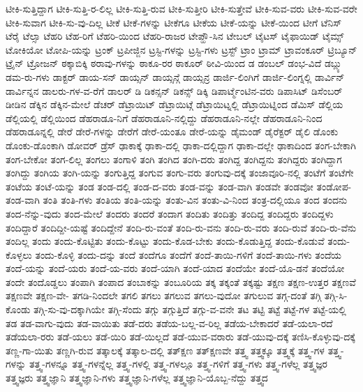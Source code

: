 {ಟೀಕಿ-ಸುತ್ತಿದ್ದಾಗ
ಟೀಕಿ-ಸುತ್ತಿ-ರ-ಲಿಲ್ಲ
ಟೀಕಿ-ಸುತ್ತಿ-ರುವ
ಟೀಕಿ-ಸುತ್ತೀರಿ
ಟೀಕಿ-ಸುತ್ತೇವೆ
ಟೀಕಿ-ಸುವ-ವರು
ಟೀಕಿ-ಸುವ-ವರೇ
ಟೀಕಿ-ಸುವಾಗ
ಟೀಕಿ-ಸು-ವು-ದಿಲ್ಲ
ಟೀಕೆ
ಟೀಕೆ-ಗಳನ್ನು
ಟೀಕೆಗೂ
ಟೀಕೆಯ
ಟೀಕೆ-ಯನ್ನು
ಟೀಕೆ-ಯಿಂದ
ಟೀಗೆ
ಟೆನಿಸ್
ಟೆರೈ
ಟೆಲ್ಸಾ
ಟೆಹರಿ
ಟೆಹ-ರಿಗೆ
ಟೆಹರಿ-ಯಿಂದ
ಟೆಹರಿ-ರಾಜರ
ಟೇಪ್ಹೌ-ಸಿನ
ಟೇಬಲ್
ಟೈಟಸ್
ಟೈಫಾಯಿಡ್
ಟೈಮ್ಸ್
ಟೋಕಿಯೋ
ಟೋಪಿ-ಯನ್ನು
ಟ್ರಂಕ್
ಟ್ರಪೀಜ್ಜಿನ
ಟ್ರಸ್ಟಿ-ಗಳನ್ನು
ಟ್ರಸ್ಟಿ-ಗಳು
ಟ್ರಸ್ಟ್
ಟ್ರಾಂ
ಟ್ರಾಮ್
ಟ್ರಾವಂಕೂರ್
ಟ್ರಿಬ್ಯೂನ್
ಟ್ರೈನ್
ಟ್ರೋಜನ್
ಠಕ್ಕಾಬಿಕ್ಕಿ
ಠರಾವು-ಗಳನ್ನು
ಠಾಕೂ-ರರ
ಠಾಕೂರ್
ಠೀವಿ-ಯಿಂದ
ಡ
ಡಂಬಲ್
ಡಂಭ-ವಿದೆ
ಡಬ್ಲ್ಯು
ಡಮ-ರು-ಗಳು
ಡಾಕ್ಟರ್
ಡಾಯ-ಸನ್
ಡಾಯ್ಸನ್
ಡಾಯ್ಸನ್ಗೆ
ಡಾಯ್ಸನ್ರ
ಡಾರ್ಜಿ-ಲಿಂಗಿಗೆ
ಡಾರ್ಜಿ-ಲಿಂಗ್ನಲ್ಲಿ
ಡಾರ್ವಿನ್
ಡಾರ್ವಿನ್ನನ
ಡಾಲರು-ಗಳ-ವ-ರೆಗೆ
ಡಾಲರ್
ಡಿ
ಡಿಕನ್ಸನ್
ಡಿಕನ್ಸ್
ಡಿಕ್ಕಿ
ಡಿಪಾರ್ಟ್ಮೆಂಟಿನ-ವರು
ಡಿಪಾಸಿಟ್
ಡಿಸೆಂಬರ್
ಡೀಡಿನ
ಡೆಕ್ಕಿನ
ಡೆಕ್ಕಿನ-ಮೇಲೆ
ಡೆಚರ್
ಡೆಟ್ರಾಯಿಟ್
ಡೆಟ್ರಾಯಿಟ್ಗೆ
ಡೆಟ್ರಾಯಿಟ್ನಲ್ಲಿ
ಡೆಟ್ರಾಯಿಟ್ನಿಂದ
ಡೆಮಿಸ್
ಡೆಲ್ಲಿಯ
ಡೆಲ್ಲಿಯಲ್ಲಿ
ಡೆಲ್ಲಿಯಿಂದ
ಡೆಹರಾಡೂ-ನಿಗೆ
ಡೆಹರಾಡೂನಿ-ನಲ್ಲಿದ್ದು
ಡೆಹರಾಡೂನಿ-ನಲ್ಲೇ
ಡೆಹರಾಡೂನಿ-ನಿಂದ
ಡೆಹರಾಡೂನ್ನಲ್ಲಿ
ಡೇರೆ
ಡೇರೆ-ಗಳನ್ನು
ಡೇರೆಗೆ
ಡೇರೆ-ಯಂತೂ
ಡೇರೆ-ಯನ್ನು
ಡೈಮಂಡ್
ಡೈರೆಕ್ಟರ್
ಡೈಲಿ
ಡೊಂಕು
ಡೊಂಕು-ಡೊಂಕಾಗಿ
ಡೋವರ್
ಡ್ರೆಸ್
ಢಾಕಾಕ್ಕೆ
ಢಾಕಾ-ದಲ್ಲಿ
ಢಾಕಾ-ದಲ್ಲಿದ್ದಾಗ
ಢಾಕಾ-ದಲ್ಲೇ
ಢಾಕಾದಿಂದ
ತಂಗ-ಬೇಕಾಗಿ
ತಂಗ-ಬೇಕೋ
ತಂಗ-ಲಿಲ್ಲ
ತಂಗಲು
ತಂಗಾಳಿ
ತಂಗಿ
ತಂಗಿದ
ತಂಗಿ-ದರು
ತಂಗಿದ್ದ
ತಂಗಿದ್ದನು
ತಂಗಿದ್ದರು
ತಂಗಿದ್ದಾಗ
ತಂಗಿದ್ದು
ತಂಗಿಯ
ತಂಗಿ-ಯನ್ನು
ತಂಗುತ್ತಿದ್ದ
ತಂಗುವ
ತಂಗು-ವರು
ತಂಗುವು-ದಕ್ಕೆ
ತಂಜಾವೂರಿ-ನಲ್ಲಿ
ತಂಟೆಗೆ
ತಂಟೆಗೇ
ತಂಟೆಯ
ತಂಟೆ-ಯನ್ನು
ತಂಡ
ತಂಡ-ದಲ್ಲಿ
ತಂಡ-ದ-ವರು
ತಂಡ-ವನ್ನು
ತಂಡ-ವಾಗಿ
ತಂಡವೇ
ತಂಡವೋ
ತಂಡೋಪ-ತಂಡ-ವಾಗಿ
ತಂತಿ
ತಂತಿ-ಗಳು
ತಂತಿಯ
ತಂತಿ-ಯನ್ನು
ತಂತು-ವಿನ
ತಂತು-ವಿ-ನಿಂದ
ತಂತ್ರ-ದಲ್ಲಿಯೂ
ತಂದ
ತಂದನು
ತಂದ-ನೆನ್ನು-ವುದು
ತಂದ-ಮೇಲೆ
ತಂದರು
ತಂದರೆ
ತಂದಾಗ
ತಂದಿತು
ತಂದಿತ್ತು
ತಂದಿದ್ದ
ತಂದಿದ್ದರು
ತಂದಿದ್ದಳು
ತಂದಿದ್ದಾರೆ
ತಂದಿದ್ದೀ-ಯಷ್ಟೆ
ತಂದಿದ್ದೇನೆ
ತಂದಿ-ರು-ವಂತೆ
ತಂದಿ-ರು-ವನು
ತಂದಿ-ರು-ವರು
ತಂದಿ-ರುವೆ
ತಂದಿ-ರು-ವೆನು
ತಂದಿಲ್ಲ
ತಂದು
ತಂದು-ಕೊಟ್ಟಿತು
ತಂದು-ಕೊಟ್ಟು
ತಂದು-ಕೊಡ-ಬೇಕು
ತಂದು-ಕೊಡುತ್ತಿದ್ದ
ತಂದು-ಕೊಡುವೆ
ತಂದು-ಕೊಳ್ಳಲು
ತಂದು-ಕೊಳ್ಳಿ
ತಂದು-ದನ್ನು
ತಂದೆ
ತಂದೆಗೂ
ತಂದೆಗೆ
ತಂದೆ-ತಾಯಿ-ಗಳಿಗೆ
ತಂದೆ-ತಾಯಿ-ಗಳು
ತಂದೆಯ
ತಂದೆ-ಯನ್ನು
ತಂದೆ-ಯರು
ತಂದೆ-ಯ-ವರು
ತಂದೆ-ಯಾಗಿ
ತಂದೆ-ಯಾದ
ತಂದೆಯೇ
ತಂದೆ-ಯೊ-ಡನೆ
ತಂದೆಯೋ
ತಂದೇ
ತಂದೊಡ್ಡಲು
ತಂಪಾಗಿ
ತಂಪಾದ
ತಂಬಾಕನ್ನು
ತಂಬೂರಿಯ
ತಕ್ಕ
ತಕ್ಕಂತೆ
ತಕ್ಕಷ್ಟು
ತಕ್ಷಣ
ತಕ್ಷಣ-ಉತ್ತರ
ತಕ್ಷಣವೆ
ತಕ್ಷಣವೇ
ತಕ್ಷಣ-ವೇ-
ತಗಡಿ-ನಿಂದಲೇ
ತಗಲಿ
ತಗಲು
ತಗಲುವ
ತಗಲು-ವುದೋ
ತಗುಲುವ
ತಗ್ಗ-ದಂತೆ
ತಗ್ಗಿ
ತಗ್ಗಿ-ಸಿ-ಕೊಂಡು
ತಗ್ಗಿ-ಸು-ವು-ದಕ್ಕಾಗಿಯೇ
ತಗ್ಗಿ-ಸೆಂದು
ತಗ್ಗು
ತಗ್ಗುತ್ತಿದೆ
ತಗ್ಗು-ವ-ವನೇ
ತಟ
ತಟ್ಟಿ
ತಟ್ಟೆ
ತಟ್ಟೆ-ಗಳ
ತಟ್ಟೆ-ಯಲ್ಲಿ
ತಡ
ತಡ-ವಾಗು-ವುದು
ತಡ-ವಾಯಿತು
ತಡೆ-ದರು
ತಡೆಯ-ಬಲ್ಲ-ವ-ರಿಲ್ಲ
ತಡೆಯ-ಬೇಕಾದರೆ
ತಡೆ-ಯಲಾ-ರದೆ
ತಡೆಯಲಾ-ರರು
ತಡೆ-ಯಲು
ತಡೆ-ಯಿರಿ
ತಡೆ-ಯಿಲ್ಲದೆ
ತಡೆ-ಯುವ-ವರಾರು
ತಡೆ-ಯುವು-ದಕ್ಕೆ
ತಣಿಸಿ-ಕೊಳ್ಳುವು-ದಕ್ಕೆ
ತಣ್ಣ-ಗಾ-ಯಿತು
ತಣ್ಣಗಿ-ರುವ
ತತ್ಕಾಲಕ್ಕೆ
ತತ್ಕಾಲ-ದಲ್ಲಿ
ತತ್ಕ್ಷಣ
ತತ್ಕ್ಷಣವೇ
ತತ್ತ್ವ
ತತ್ತ್ವಕ್ಕೂ
ತತ್ತ್ವಕ್ಕೆ
ತತ್ತ್ವ-ಗಳ
ತತ್ತ್ವ-ಗಳನ್ನು
ತತ್ತ್ವ-ಗಳನ್ನೂ
ತತ್ತ್ವ-ಗಳನ್ನೆಲ್ಲ
ತತ್ತ್ವ-ಗಳಲ್ಲಿ
ತತ್ತ್ವ-ಗಳಲ್ಲೂ
ತತ್ತ್ವ-ಗಳಿಗೆ
ತತ್ತ್ವ-ಗಳು
ತತ್ತ್ವ-ಗಳೆಲ್ಲ
ತತ್ತ್ವಜ್ಞರ
ತತ್ತ್ವಜ್ಞರು
ತತ್ತ್ವಜ್ಞಾನಿ
ತತ್ತ್ವಜ್ಞಾನಿ-ಗಳು
ತತ್ತ್ವಜ್ಞಾನಿ-ಗಳೆಲ್ಲ
ತತ್ತ್ವಜ್ಞಾನಿ-ಯೊಬ್ಬ-ನೆದ್ದು
ತತ್ತ್ವದ
}
